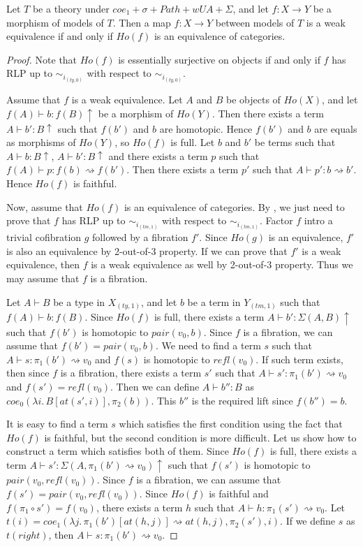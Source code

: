 \documentclass{mscs}
\newcommand{\idtype}{\rightsquigarrow}
\numberwithin{figure}{section}
\begin{document}
\begin{prop}[sigma-we-ho]
Let $T$ be a theory under $coe_1 + \sigma + Path + wUA + \Sigma$, and let $f : X \to Y$ be a morphism of models of $T$.
Then a map $f : X \to Y$ between models of $T$ is a weak equivalence if and only if $Ho(f)$ is an equivalence of categories.
\end{prop}
\begin{proof}
Note that $Ho(f)$ is essentially surjective on objects if and only if $f$ has RLP up to $\sim_{i_{(ty,0)}}$ with respect to $\sim_{i_{(ty,0)}}$.

Assume that $f$ is a weak equivalence.
Let $A$ and $B$ be objects of $Ho(X)$, and let $f(A) \vdash b : f(B)\!\uparrow$ be a morphism of $Ho(Y)$.
Then there exists a term $A \vdash b' : B\!\uparrow$ such that $f(b')$ and $b$ are homotopic.
Hence $f(b')$ and $b$ are equals as morphisms of $Ho(Y)$, so $Ho(f)$ is full.
Let $b$ and $b'$ be terms such that $A \vdash b : B\!\uparrow$, $A \vdash b' : B\!\uparrow$ and there exists a term $p$ such that $f(A) \vdash p : f(b) \idtype f(b')$.
Then there exists a term $p'$ such that $A \vdash p' : b \idtype b'$.
Hence $Ho(f)$ is faithful.

Now, assume that $Ho(f)$ is an equivalence of categories.
By , we just need to prove that $f$ has RLP up to $\sim_{i_{(tm,1)}}$ with respect to $\sim_{i_{(tm,1)}}$.
Factor $f$ intro a trivial cofibration $g$ followed by a fibration $f'$.
Since $Ho(g)$ is an equivalence, $f'$ is also an equivalence by 2-out-of-3 property.
If we can prove that $f'$ is a weak equivalence, then $f$ is a weak equivalence as well by 2-out-of-3 property.
Thus we may assume that $f$ is a fibration.

Let $A \vdash B$ be a type in $X_{(ty,1)}$, and let $b$ be a term in $Y_{(tm,1)}$ such that $f(A) \vdash b : f(B)$.
Since $Ho(f)$ is full, there exists a term $A \vdash b' : \Sigma(A,B)\!\uparrow$ such that $f(b')$ is homotopic to $pair(v_0,b)$.
Since $f$ is a fibration, we can assume that $f(b') = pair(v_0,b)$.
We need to find a term $s$ such that $A \vdash s : \pi_1(b') \idtype v_0$ and $f(s)$ is homotopic to $refl(v_0)$.
If such term exists, then since $f$ is a fibration, there exists a term $s'$ such that $A \vdash s' : \pi_1(b') \idtype v_0$ and $f(s') = refl(v_0)$.
Then we can define $A \vdash b'' : B$ as $coe_0(\lambda i.\,B[at(s',i)], \pi_2(b))$.
This $b''$ is the required lift since $f(b'') = b$.

It is easy to find a term $s$ which satisfies the first condition using the fact that $Ho(f)$ is faithful, but the second condition is more difficult.
Let us show how to construct a term which satisfies both of them.
Since $Ho(f)$ is full, there exists a term $A \vdash s' : \Sigma(A, \pi_1(b') \idtype v_0)\!\uparrow$ such that $f(s')$ is homotopic to $pair(v_0, refl(v_0))$.
Since $f$ is a fibration, we can assume that $f(s') = pair(v_0, refl(v_0))$.
Since $Ho(f)$ is faithful and $f(\pi_1 \circ s') = f(v_0)$, there exists a term $h$ such that $A \vdash h : \pi_1(s') \idtype v_0$.
Let $t(i) = coe_1(\lambda j.\,\pi_1(b')[at(h,j)] \idtype at(h,j), \pi_2(s'), i)$.
If we define $s$ as $t(right)$, then $A \vdash s : \pi_1(b') \idtype v_0$.


\end{proof}
\end{document}
